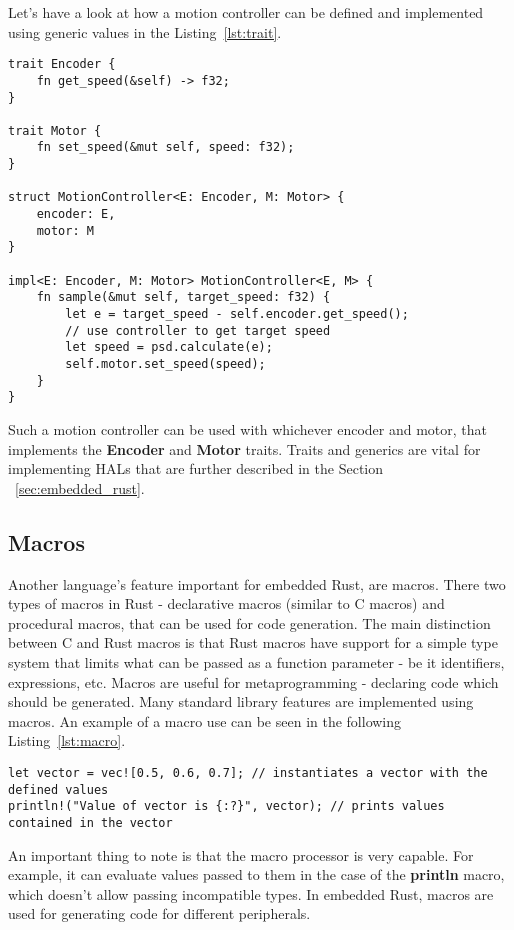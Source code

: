 Let's have a look at how a motion controller can be defined and implemented using generic values in the Listing~\ref{lst:trait}.

\begin{lstlisting}[caption={Using traits and generics for shared behavior in Rust.},label=lst:trait]
trait Encoder {
    fn get_speed(&self) -> f32;
}

trait Motor {
    fn set_speed(&mut self, speed: f32);
}

struct MotionController<E: Encoder, M: Motor> {
    encoder: E,
    motor: M
}

impl<E: Encoder, M: Motor> MotionController<E, M> {
    fn sample(&mut self, target_speed: f32) {
        let e = target_speed - self.encoder.get_speed();
        // use controller to get target speed
        let speed = psd.calculate(e);
        self.motor.set_speed(speed);
    }
}
\end{lstlisting}

Such a motion controller can be used with whichever encoder and motor, that implements the \textbf{Encoder} and \textbf{Motor} traits.
Traits and generics are vital for implementing HALs that are further described in the Section ~\ref{sec:embedded_rust}.

\newpage
\subsection{Macros}
\label{subsec:macros}
Another language's feature important for embedded Rust, are macros.
There two types of macros in Rust - declarative macros (similar to C macros) and procedural macros, that can be used for code generation.
The main distinction between C and Rust macros is that Rust macros have support for a simple type system that limits what can be passed as a function parameter - be it identifiers, expressions, etc.
Macros are useful for metaprogramming - declaring code which should be generated.
Many standard library features are implemented using macros.
An example of a macro use can be seen in the following Listing~\ref{lst:macro}.
\begin{lstlisting}[caption={Using macros in Rust to initialize a vector and print its values.},label=lst:macro]
let vector = vec![0.5, 0.6, 0.7]; // instantiates a vector with the defined values
println!("Value of vector is {:?}", vector); // prints values contained in the vector
\end{lstlisting}

An important thing to note is that the macro processor is very capable.
For example, it can evaluate values passed to them in the case of the \textbf{println} macro, which doesn't allow passing incompatible types.
In embedded Rust, macros are used for generating code for different peripherals.

